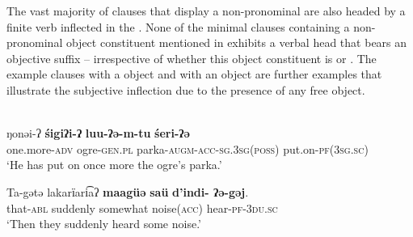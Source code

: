 \documentclass[output=paper]{LSP/langsci}
\begin{document}

The vast majority of clauses that display a non-pronominal  are also headed by a finite verb inflected in the . None of the minimal clauses containing a non-pronominal object constituent mentioned in  exhibits a verbal head that bears an objective suffix -- irrespective of whether this object constituent is  or . The example clauses  with a  object and  with an  object are further examples that illustrate the subjective inflection due to the presence of any free object.

\ea \label{12-wr-ex:9}%
\\

\ea \label{12-wr-ex:9a}
\gll ŋonəi-ʔ \textbf{śigiʔi-ʔ}  \textbf{luu-ʔə-m-tu}  \textbf{śeri-ʔə}\\
 one.more\textsc{-adv} ogre-\textsc{gen.pl} parka-\textsc{augm-acc-sg.3sg(poss)} put.on-\textsc{pf(3sg.sc)}\\
\glt  ‘He has put on once more the ogre’s parka.’

\ex \label{12-wr-ex:9b}
\gll Ta-gǝtǝ lakarїari͡aʔ     \textbf{maagüə}  \textbf{saü}  \textbf{d’indi- ʔə-gǝj}.\\
 that-\textsc{abl} suddenly somewhat noise(\textsc{acc)} hear-\textsc{pf-3du.sc}\\
\glt ‘Then they suddenly heard some noise.’
\z
\z
\end{document}
